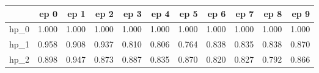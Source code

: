 \begin{tabular}{lrrrrrrrrrr}
\toprule
{} &   ep 0 &   ep 1 &   ep 2 &   ep 3 &   ep 4 &   ep 5 &   ep 6 &   ep 7 &   ep 8 &   ep 9 \\
\midrule
hp\_0 &  1.000 &  1.000 &  1.000 &  1.000 &  1.000 &  1.000 &  1.000 &  1.000 &  1.000 &  1.000 \\
hp\_1 &  0.958 &  0.908 &  0.937 &  0.810 &  0.806 &  0.764 &  0.838 &  0.835 &  0.838 &  0.870 \\
hp\_2 &  0.898 &  0.947 &  0.873 &  0.887 &  0.835 &  0.870 &  0.820 &  0.827 &  0.792 &  0.866 \\
\bottomrule
\end{tabular}
